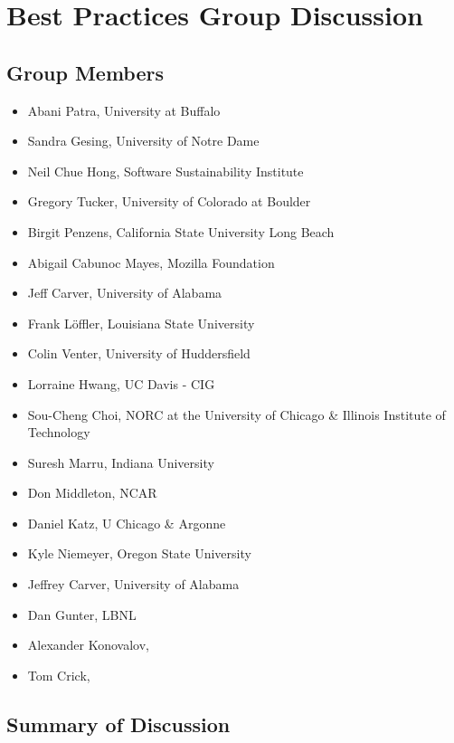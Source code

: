 \section{Best Practices Group Discussion}
\label{sec:appendix_best_practices}


\subsection{Group Members}

\begin{itemize}
\item Abani Patra, University at Buffalo
\item Sandra Gesing, University of Notre Dame
\item Neil Chue Hong, Software Sustainability Institute
\item Gregory Tucker, University of Colorado at Boulder
\item Birgit Penzens, California State University Long Beach
\item Abigail Cabunoc Mayes, Mozilla Foundation
\item Jeff Carver, University of Alabama
\item Frank L\"{o}ffler, Louisiana State University 
\item Colin Venter,  University of Huddersfield
\item Lorraine Hwang, UC Davis - CIG
\item Sou-Cheng Choi, NORC at the University of Chicago \&  Illinois Institute of Technology
\item Suresh Marru, Indiana University
\item Don Middleton, NCAR 
\item Daniel Katz,  U Chicago \& Argonne
\item Kyle Niemeyer, Oregon State University
\item Jeffrey Carver, University of Alabama
\item Dan Gunter, LBNL
\item Alexander Konovalov, 
\item Tom Crick,  

\end{itemize}

\subsection{Summary of Discussion}

